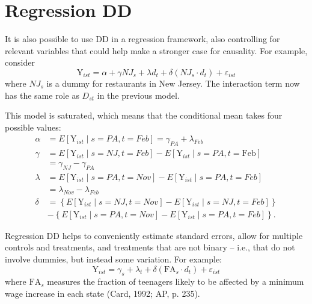 \documentclass[11pt, a4paper]{report}
\theoremstyle{plain}
\theoremstyle{plain}
\theoremstyle{remark}
\begin{document}
\section{Regression DD}

It is also possible to use DD in a regression framework, also controlling for relevant variables that could help make a stronger case for causality. For example, consider
\begin{equation}
    \mathrm{Y}_{i s t}=\alpha+\gamma N J_{s}+\lambda d_{t}+\delta\left(N J_{s} \cdot d_{t}\right)+\varepsilon_{i s t}
\end{equation}
where $NJ_s$ is a dummy for restaurants in New Jersey. The interaction term now has the same role as $D_{st}$ in the previous model. 

This model is saturated, which means that the conditional mean takes four possible values: 
\begin{equation}
    \begin{aligned}
    \alpha &=E\left[\mathrm{Y}_{i s t} \mid s=P A, t=F e b\right]=\gamma_{P A}+\lambda_{F e b} \\
    \gamma &=E\left[\mathrm{Y}_{i s t} \mid s=N J, t=F e b\right]-E\left[\mathrm{Y}_{i s t} \mid s=P A, t=\mathrm{Feb}\right] \\
    &=\gamma_{N J}-\gamma_{P A} \\
    \lambda &=E\left[\mathrm{Y}_{i s t} \mid s=P A, t=N o v\right]-E\left[\mathrm{Y}_{i s t} \mid s=P A, t=F e b\right] \\
    &=\lambda_{N o v}-\lambda_{F e b} \\
    \delta &=\left\{E\left[\mathrm{Y}_{i s t} \mid s=N J, t=N o v\right]-E\left[\mathrm{Y}_{i s t} \mid s=N J, t=F e b\right]\right\} \\
    &-\left\{E\left[\mathrm{Y}_{i s t} \mid s=P A, t=N o v\right]-E\left[\mathrm{Y}_{i s t} \mid s=P A, t=F e b\right]\right\} .
    \end{aligned}
\end{equation}

Regression DD helps to conveniently estimate standard errors, allow for multiple controls and treatments, and treatments that are not binary -- i.e., that do not involve dummies, but instead some variation. For example:
\begin{equation}
    \mathrm{Y}_{i s t}=\gamma_{s}+\lambda_{t}+\delta\left(\mathrm{FA}_{s} \cdot d_{t}\right)+\varepsilon_{i s t}
    \end{equation}
where $\mathrm{FA}_{s}$ measures the fraction of teenagers likely to be affected by a minimum wage increase in each state (Card, 1992; AP, p. 235).
\end{document}
